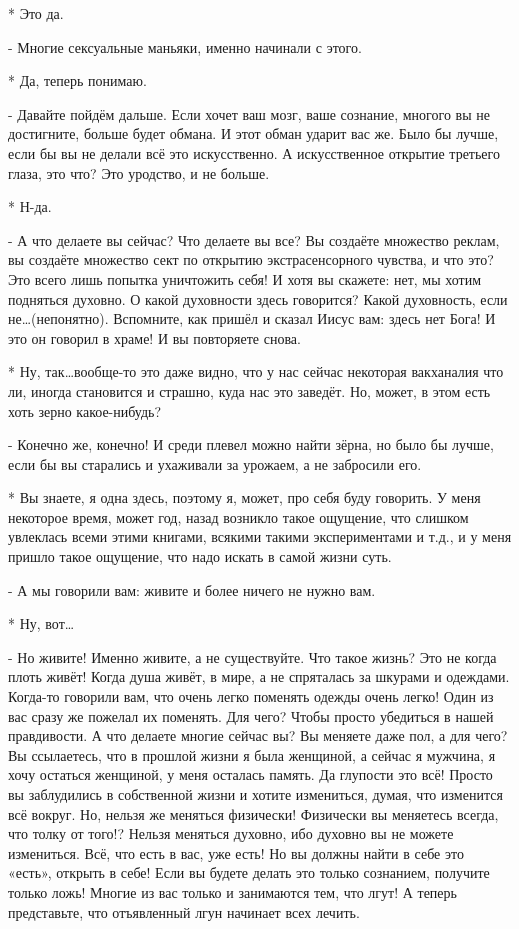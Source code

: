 * Это да.

- Многие сексуальные маньяки, именно начинали с этого.

* Да, теперь понимаю.

- Давайте пойдём дальше. Если хочет ваш мозг, ваше сознание, многого вы не достигните, больше будет обмана. И этот обман ударит вас же. Было бы лучше, если бы вы не делали всё это искусственно. А искусственное открытие третьего глаза, это что?  Это уродство, и не больше.

* Н-да.

- А что делаете вы сейчас? Что делаете вы все? Вы создаёте множество реклам, вы создаёте множество сект по открытию экстрасенсорного чувства, и что это? Это всего лишь попытка уничтожить себя! И хотя вы скажете: нет, мы хотим подняться духовно. О какой духовности здесь говорится? Какой духовность, если не…(непонятно). Вспомните, как пришёл и сказал Иисус вам: здесь нет Бога! И это он говорил в храме! И вы повторяете снова.

* Ну, так…вообще-то это даже видно, что у нас сейчас некоторая вакханалия что ли, иногда становится и страшно, куда нас это заведёт. Но, может, в этом есть хоть зерно какое-нибудь?

- Конечно же, конечно! И среди плевел можно найти зёрна, но было бы лучше, если бы вы старались и ухаживали за урожаем, а не забросили его.

* Вы знаете, я одна здесь, поэтому я, может, про себя буду говорить. У меня некоторое время, может год, назад возникло такое ощущение, что слишком увлеклась всеми этими книгами, всякими такими экспериментами и т.д., и у меня пришло такое ощущение, что надо искать в самой жизни суть.

- А мы говорили вам: живите и более ничего не нужно вам.

* Ну, вот…

- Но живите! Именно живите, а не существуйте. Что такое жизнь? Это не когда плоть живёт! Когда душа живёт, в мире, а не спряталась за шкурами и одеждами. Когда-то говорили вам, что очень легко поменять одежды очень легко! Один из вас сразу же пожелал их поменять. Для чего? Чтобы просто убедиться в нашей правдивости. А что делаете многие сейчас вы? Вы меняете даже пол, а для чего? Вы ссылаетесь, что в прошлой жизни я была женщиной, а сейчас я мужчина, я хочу остаться женщиной, у меня осталась память. Да глупости это всё! Просто вы заблудились в собственной жизни и хотите измениться, думая, что изменится всё вокруг. Но, нельзя же меняться физически! Физически вы меняетесь всегда, что толку от того!?  Нельзя меняться духовно, ибо духовно вы не можете измениться. Всё, что есть в вас, уже есть! Но вы должны найти в себе это «есть», открыть в себе! Если вы будете делать это только сознанием, получите только ложь!  Многие из вас только и занимаются тем, что лгут! А теперь представьте, что отъявленный лгун начинает всех лечить. 

